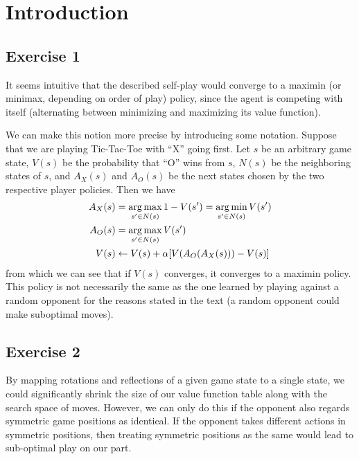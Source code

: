 \section{Introduction}

\subsection{Exercise 1}
It seems intuitive that the described self-play would converge to a maximin (or minimax, depending on order of play) policy, since the agent is 
competing with itself (alternating between minimizing and maximizing its value function). 

We can make this notion more precise by introducing some notation. Suppose that we are playing Tic-Tac-Toe
with ``X'' going first. Let $s$ be an arbitrary game state, $V(s)$ be the probability that ``O'' wins from $s$, $N(s)$ be the neighboring states of $s$,
and $A_X(s)$ and $A_O(s)$ be the next states chosen by the two respective player policies.
Then we have
\begin{align*}
        A_X(s) &= \operatorname*{arg\,max}_{s' \in N(s)} 1 - V(s') = \operatorname*{arg\,min}_{s' \in N(s)} V(s') \\
        A_O(s) &= \operatorname*{arg\,max}_{s' \in N(s)} V(s') \\
        V(s) &\gets V(s) + \alpha [V(A_O(A_X(s))) - V(s)]
\end{align*}
from which we can see that if $V(s)$ converges, it converges to a maximin policy. This policy is not
necessarily the same as the one learned by playing against a random opponent for the reasons stated in the
text (a random opponent could make suboptimal moves).

\subsection{Exercise 2}
By mapping rotations and reflections of a given game state to a single state, we could significantly shrink
the size of our value function table along with the search space of moves. However, we can only do this if
the opponent also regards symmetric game positions as identical. If the opponent takes different actions
in symmetric positions, then treating symmetric positions as the same would lead to sub-optimal play on our
part. 

